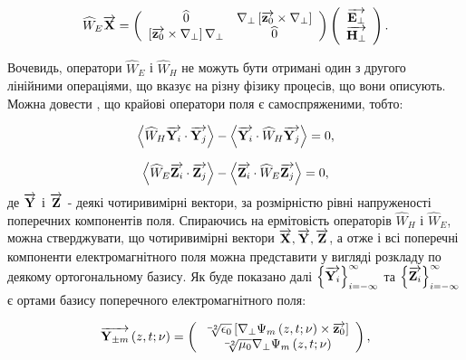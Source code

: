 \begin{equation} \label{eq:W_E}
\widehat{W}_E \overrightarrow{\mathbf X} = \left( \begin{array}{cc} \widehat{0} & 
\nabla_\perp \left[ \overrightarrow{\mathbf z_0} \times \nabla_\perp \right] \\
\left[ \overrightarrow{\mathbf z_0} \times \nabla_\perp \right] \nabla_\perp &
\widehat{0} \\ \end{array} \right) \left( \begin{array}{c} 
\overrightarrow{\mathbf E_\perp} \\ \overrightarrow{\mathbf H_\perp} \\ \end{array} \right).
\end{equation}

Вочевидь, оператори $ \widehat{W}_E $ і $ \widehat{W}_H $ не можуть бути 
отримані один з другого лінійними операціями, що вказує на різну фізику 
процесів, що вони описують. Можна довести 
\cite{imp:Dumin1996, imp:Tretyakov1993}, що крайові оператори поля є 
самоспряженими, тобто:

\begin{equation}
\left< \widehat{W}_H \overrightarrow{\mathbf Y_i} \cdot \overrightarrow{\mathbf Y_j} \right> -
\left< \overrightarrow{\mathbf Y_i} \cdot \widehat{W}_H \overrightarrow{\mathbf Y_j} \right> = 0,
\end{equation}

\begin{equation}
\left< \widehat{W}_E \overrightarrow{\mathbf Z_i} \cdot \overrightarrow{\mathbf Z_j} \right> -
\left< \overrightarrow{\mathbf Z_i} \cdot \widehat{W}_E \overrightarrow{\mathbf Z_j} \right> = 0,
\end{equation}
%
де $ \overrightarrow{\mathbf Y} $ і $ \overrightarrow{\mathbf Z} $ - деякі чотиривимірні вектори, за розмірністю 
рівні напруженості поперечних компонентів поля. Спираючись на ермітовість 
операторів $ \widehat{W}_H $ і $ \widehat{W}_E $, можна стверджувати, що 
чотиривимірні вектори $ \overrightarrow{\mathbf X}, \overrightarrow{\mathbf Y}, \overrightarrow{\mathbf Z} $, а отже і всі поперечні 
компоненти електромагнітного поля можна представити у вигляді розкладу по 
деякому ортогональному базису. Як буде показано далі
$ \left\{ \overrightarrow{\mathbf Y_i} \right\}_{i=-\infty}^\infty $ та 
$ \left\{ \overrightarrow{\mathbf Z_i} \right\}_{i=-\infty}^\infty $ є ортами базису 
поперечного електромагнітного поля:

\begin{equation} \label{eq:vectY}
\overrightarrow{\mathbf Y_{\pm m}} \left( z,t;\nu \right) =
\left( \begin{array}{c} 
\sqrt[-2]{\epsilon_0} 
\left[ \nabla_\perp \Psi_m \left( z,t;\nu \right) \times \overrightarrow{\mathbf z_0} \right] \\ 
\sqrt[-2]{\mu_0} \nabla_\perp \Psi_m \left( z,t;\nu \right) \\ 
\end{array} \right),
\end{equation}


